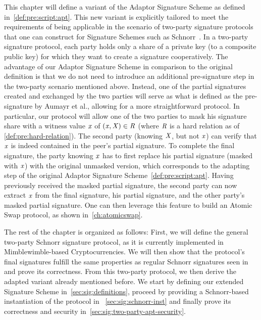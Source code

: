 This chapter will define a variant of the Adaptor Signature Scheme as defined in~\cref{def:pre:script:apt}.
This new variant is explicitly tailored to meet the requirements of being applicable in the scenario of two-party signature protocols that one can construct for Signature Schemes such as Schnorr~\cite{maxwell2019simple}.
In a two-party signature protocol, each party holds only a share of a private key (to a composite public key) for which they want to create a signature cooperatively.
The advantage of our Adaptor Signature Scheme in comparison to the original definition is that we do not need to introduce an additional pre-signature step in the two-party scenario mentioned above.
Instead, one of the partial signatures created and exchanged by the two parties will serve as what is defined as the pre-signature by Aumayr et al., allowing for a more straightforward protocol.
In particular, our protocol will allow one of the two parties to mask his signature share with a witness value $\mathit{x}$ of $(\mathit{x}, \mathit{X}) \in \mathit{R}$ (where $\mathit{R}$ is a hard relation as of \cref{def:pre:hard-relation}).
The second party (knowing $\mathit{X}$, but not $\mathit{x}$) can verify that $\mathit{x}$ is indeed contained in the peer's partial signature.
To complete the final signature, the party knowing $\mathit{x}$ has to first replace his partial signature (masked with $\mathit{x}$) with the original unmasked version, which corresponds to the adapting step of the original Adaptor Signature Scheme~\cref{def:pre:script:apt}.
Having previously received the masked partial signature, the second party can now extract $\mathit{x}$ from the final signature, his partial signature, and the other party's masked partial signature.
One can then leverage this feature to build an Atomic Swap protocol, as shown in~\cref{ch:atomicswap}.

The rest of the chapter is organized as follows:
First, we will define the general two-party Schnorr signature protocol, as it is currently implemented in Mimblewimble-based Cryptocurrencies.
We will then show that the protocol's final signatures fulfill the same properties as regular Schnorr signatures seen in~\cite{schnorr1989efficient} and prove its correctness.
From this two-party protocol, we then derive the adapted variant already mentioned before.
We start by defining our extended Signature Scheme in~\cref{sec:sig:definitions}, proceed by providing a Schnorr-based instantiation of the protocol in ~\cref{sec:sig:schnorr-inst} and finally prove its correctness and security in~\cref{sec:sig:two-party-apt-security}.

